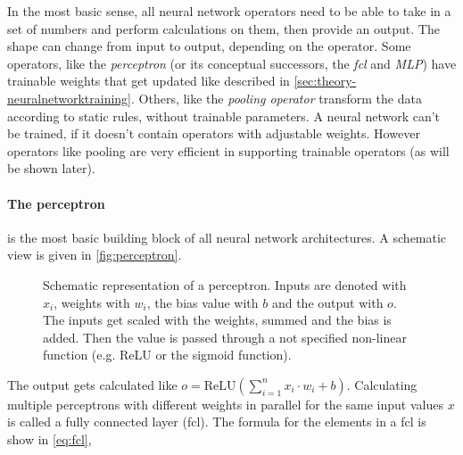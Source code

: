 In the most basic sense, all neural network operators need to be able to take in a set of numbers and perform calculations on them, then provide an output.
The shape can change from input to output, depending on the operator.
Some operators, like the \emph{perceptron} (or its conceptual successors, the \emph{fcl} and \emph{MLP}) have trainable weights that get updated like described in \autoref{sec:theory-neuralnetworktraining}.
Others, like the \emph{pooling operator} transform the data according to static rules, without trainable parameters.
A neural network can't be trained, if it doesn't contain operators with adjustable weights.
However operators like pooling are very efficient in supporting trainable operators (as will be shown later).

\paragraph{The perceptron} is the most basic building block of all neural network architectures.
A schematic view is given in \autoref{fig:perceptron}.

\begin{figure}[htbp]
    \centering
    \caption{Schematic representation of a perceptron. Inputs are denoted with $x_i$, weights with $w_i$, the bias value with $b$ and the output with $o$. 
        The inputs get scaled with the weights, summed and the bias is added.
        Then the value is passed through a not specified non-linear function (e.g. ReLU or the sigmoid function).
    }
    \label{fig:perceptron}
\end{figure}

The output gets calculated like $o = \mathrm{ReLU} \left(\sum\limits_{i=1}^{n} x_i\cdot w_i + b\right)$.
Calculating multiple perceptrons with different weights in parallel for the same input values $x$ is called a fully connected layer (fcl).
The formula for the elements in a fcl is show in \autoref{eq:fcl},

